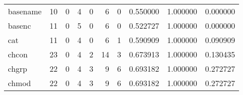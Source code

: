 \begin{tabular}{lrrrrrrrrr}
basename  &                                       10 &                                                  0 &                                                  4 &                                                  0 &                                                  6 &                                                  0 &                                           0.550000 &                               1.000000 &                             0.000000 \\
basenc    &                                       11 &                                                  0 &                                                  5 &                                                  0 &                                                  6 &                                                  0 &                                           0.522727 &                               1.000000 &                             0.000000 \\
cat       &                                       11 &                                                  0 &                                                  4 &                                                  0 &                                                  6 &                                                  1 &                                           0.590909 &                               1.000000 &                             0.090909 \\
chcon     &                                       23 &                                                  0 &                                                  4 &                                                  2 &                                                 14 &                                                  3 &                                           0.673913 &                               1.000000 &                             0.130435 \\
chgrp     &                                       22 &                                                  0 &                                                  4 &                                                  3 &                                                  9 &                                                  6 &                                           0.693182 &                               1.000000 &                             0.272727 \\
chmod     &                                       22 &                                                  0 &                                                  4 &                                                  3 &                                                  9 &                                                  6 &                                           0.693182 &                               1.000000 &                             0.272727 \\

\end{tabular}
